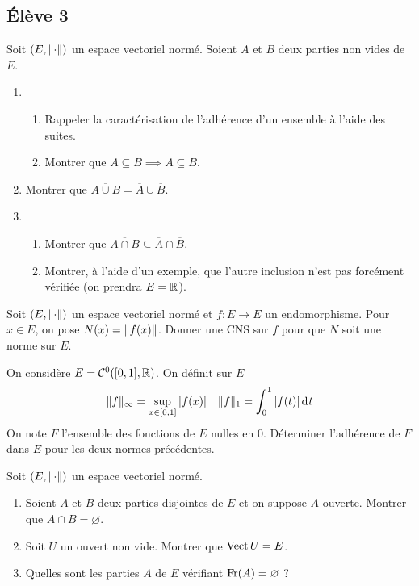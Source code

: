 \documentclass[10pt]{scrartcl}
\begin{document}
    \newpage
    \subsection*{Élève 3}
    \begin{ccp}
        Soit $(E,\lVert \cdot\rVert)$ un espace vectoriel normé. Soient $A$ et $B$ deux parties non vides de $E$.
        \begin{enumerate}
            \item 
            \begin{enumerate}
                \item Rappeler la caractérisation de l'adhérence d'un ensemble à l'aide des suites.
                \item Montrer que $A\subseteq B\implies \overline A\subseteq\overline B$.
            \end{enumerate}
            \item Montrer que $\overline{A\cup B}=\overline A\cup\overline B$.
            \item 
            \begin{enumerate}
                \item Montrer que $\overline{A\cap B}\subseteq \overline A\cap\overline B$.
                \item Montrer, à l'aide d'un exemple, que l'autre inclusion n'est pas forcément vérifiée (on prendra $E=\operatorname{\mathbb R}$).
            \end{enumerate}
        \end{enumerate}
    \end{ccp}

    \begin{exo}
        Soit $(E,\lVert \cdot\rVert)$ un espace vectoriel normé et $f:E\to E$ un endomorphisme. 
        Pour $x\in E$, on pose $N(x)=\lVert f(x)\rVert$. 
        Donner une CNS sur $f$ pour que $N$ soit une norme sur $E$.
    \end{exo}

    \begin{exo}
        On considère $E=\mathcal C^0([0,1],\operatorname{\mathbb R})$. On définit sur $E$
        \[
            \lVert f\rVert_\infty=\sup_{x\in[0,1]}|f(x)|\quad \lVert f\rVert_1=\int_0^1|f(t)|\operatorname{d\hskip-1pt} t
        \]
        On note $F$ l'ensemble des fonctions de $E$ nulles en $0$. 
        Déterminer l'adhérence de $F$ dans $E$ pour les deux normes précédentes.
    \end{exo}

    \begin{exo}
        Soit $(E,\lVert \cdot\rVert)$ un espace vectoriel normé.
        \begin{enumerate}
            \item Soient $A$ et $B$ deux parties disjointes de $E$ et on suppose $A$ ouverte. Montrer que $A\cap\overline B=\varnothing$.
            \item Soit $U$ un ouvert non vide. Montrer que $\operatorname{Vect} U=E$.
            \item Quelles sont les parties $A$ de $E$ vérifiant $\operatorname{Fr}(A)=\varnothing$ ?
        \end{enumerate}
    \end{exo}
\end{document}
